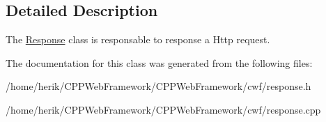 \subsection{Detailed Description}
The \hyperlink{class_response}{Response} class is responsable to response a Http request. 

The documentation for this class was generated from the following files\+:\begin{DoxyCompactItemize}
\item 
/home/herik/\+C\+P\+P\+Web\+Framework/\+C\+P\+P\+Web\+Framework/cwf/response.\+h\item 
/home/herik/\+C\+P\+P\+Web\+Framework/\+C\+P\+P\+Web\+Framework/cwf/response.\+cpp\end{DoxyCompactItemize}
